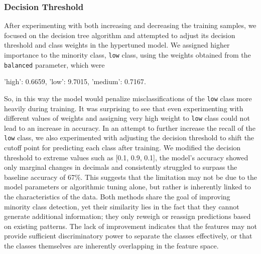\subsubsection{Decision Threshold}

After experimenting with both increasing and decreasing the training samples, 
we focused on the decision tree algorithm and attempted to adjust its decision threshold and class weights in the hypertuned model. 
We assigned higher importance to the minority class, \texttt{low} class, using the weights obtained from the \texttt{balanced} parameter, 
which were 
\begin{center}
  {'high': 0.6659, 'low': 9.7015, 'medium': 0.7167}.  
\end{center} So, in this way the model would penalize misclassifications of the \texttt{low} class more heavily during training.
It was surprising to see that even experimenting with different values of weights and assigning very high weight to \texttt{low} 
class could not lead to an increase in accuracy. In an attempt to further increase 
the recall of the \texttt{low} class, we also experimented with adjusting the decision threshold 
to shift the cutoff point for predicting each class after training.
We modified the decision threshold to extreme values such as [0.1, 0.9, 0.1], the model's accuracy showed only marginal changes in decimals and 
consistently struggled to surpass the baseline accuracy of 67\%. 
This suggests that the limitation may not be due to the model parameters or algorithmic tuning alone, 
but rather is inherently linked to the characteristics of the data.  
Both methods share the goal of improving minority class detection, yet their similarity lies in the fact that they cannot generate additional information; 
they only reweigh or reassign predictions based on existing patterns. 
The lack of improvement indicates that the features may not provide sufficient discriminatory power 
to separate the classes effectively, or that the classes themselves are inherently overlapping in the feature space. 

